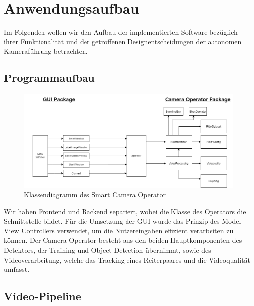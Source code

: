 \chapter{Anwendungsaufbau}
\label{ch:anwendungsaufbau}
Im Folgenden wollen wir den Aufbau der implementierten Software bezüglich ihrer Funktionalität und der getroffenen Designentscheidungen der autonomen Kameraführung betrachten. 
\section{Programmaufbau}
\begin{figure}[h]
\includegraphics[width=\textwidth]{./img/Klassendiagramm.png}
\caption{Klassendiagramm des Smart Camera Operator}
\label{fig:Klassendiagramm}
\end{figure}
Wir haben Frontend und Backend separiert, wobei die Klasse des Operators die Schnittstelle bildet. Für die Umsetzung der GUI wurde das Prinzip des Model View Controllers verwendet, um die Nutzereingaben effizient verarbeiten zu können. Der Camera Operator besteht aus den beiden Hauptkomponenten des Detektors, der Training und Object Detection übernimmt, sowie des Videoverarbeitung, welche das Tracking eines Reiterpaares und die Videoqualität  umfasst.

\newpage

\section{Video-Pipeline}

